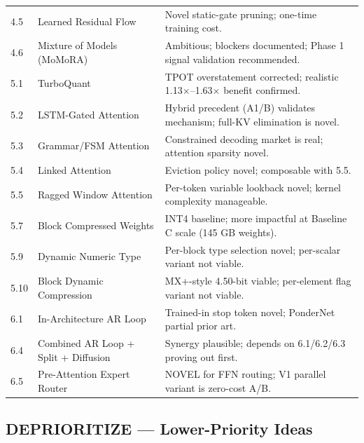 \documentclass[11pt]{article}
\begin{document}
\begin{longtable}{lp{5cm}p{7cm}}
4.5 & Learned Residual Flow & Novel static-gate pruning; one-time training cost. \\
4.6 & Mixture of Models (MoMoRA) & Ambitious; blockers documented; Phase 1 signal validation recommended. \\
5.1 & TurboQuant & TPOT overstatement corrected; realistic 1.13$\times$--1.63$\times$ benefit confirmed. \\
5.2 & LSTM-Gated Attention & Hybrid precedent (A1/B) validates mechanism; full-KV elimination is novel. \\
5.3 & Grammar/FSM Attention & Constrained decoding market is real; attention sparsity novel. \\
5.4 & Linked Attention & Eviction policy novel; composable with 5.5. \\
5.5 & Ragged Window Attention & Per-token variable lookback novel; kernel complexity manageable. \\
5.7 & Block Compressed Weights & INT4 baseline; more impactful at Baseline C scale (145 GB weights). \\
5.9 & Dynamic Numeric Type & Per-block type selection novel; per-scalar variant not viable. \\
5.10 & Block Dynamic Compression & MX+-style 4.50-bit viable; per-element flag variant not viable. \\
6.1 & In-Architecture AR Loop & Trained-in stop token novel; PonderNet partial prior art. \\
6.4 & Combined AR Loop + Split + Diffusion & Synergy plausible; depends on 6.1/6.2/6.3 proving out first. \\
6.5 & Pre-Attention Expert Router & NOVEL for FFN routing; V1 parallel variant is zero-cost A/B. \\
\end{longtable}

\subsection{DEPRIORITIZE --- Lower-Priority Ideas}
\end{document}
